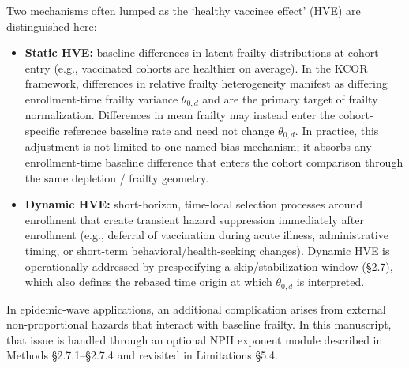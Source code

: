 \documentclass[
]{article}
\begin{document}
Two mechanisms often lumped as the `healthy vaccinee effect' (HVE) are distinguished here:

\begin{itemize}
\item
  \textbf{Static HVE:} baseline differences in latent frailty distributions at cohort entry (e.g., vaccinated cohorts are healthier on average). In the KCOR framework, differences in relative frailty heterogeneity manifest as differing enrollment-time frailty variance \(\theta_{0,d}\) and are the primary target of frailty normalization. Differences in mean frailty may instead enter the cohort-specific reference baseline rate and need not change \(\theta_{0,d}\). In practice, this adjustment is not limited to one named bias mechanism; it absorbs any enrollment-time baseline difference that enters the cohort comparison through the same depletion / frailty geometry.
\item
  \textbf{Dynamic HVE:} short-horizon, time-local selection processes around enrollment that create transient hazard suppression immediately after enrollment (e.g., deferral of vaccination during acute illness, administrative timing, or short-term behavioral/health-seeking changes). Dynamic HVE is operationally addressed by prespecifying a skip/stabilization window (§2.7), which also defines the rebased time origin at which \(\theta_{0,d}\) is interpreted.
\end{itemize}

In epidemic-wave applications, an additional complication arises from external non-proportional hazards that interact with baseline frailty. In this manuscript, that issue is handled through an optional NPH exponent module described in Methods §2.7.1--§2.7.4 and revisited in Limitations §5.4.
\end{document}
